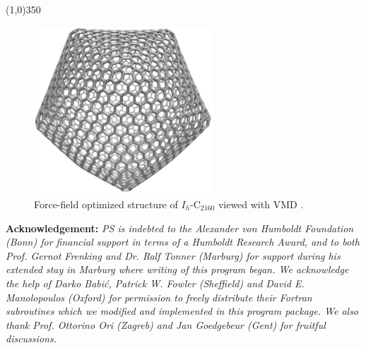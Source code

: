 \documentclass[article,a4paper,twoside]{memoir}
\newcommand{\C}[1]{\ensuremath{\mathrm{C}_{#1}}}
\begin{document}
\clearpage

\tableofcontents
\begin{center}
\line(1,0){350}
\end{center}

\vspace{1cm}
 \begin{figure}[htbp]
	\centering
  		 \includegraphics[width=0.6\textwidth]{C2160.png}
     \caption{Force-field optimized structure of $I_h$-\C{2160} viewed with VMD \cite{vmd}.}
     \label{pic:Finalgraph}
 \end{figure}

\vspace{2cm}
\textbf{Acknowledgement:} \textit{PS is indebted to the Alexander von Humboldt Foundation (Bonn) for financial support 
in terms of a Humboldt Research Award, and to both Prof. Gernot Frenking and 
Dr. Ralf Tonner (Marburg) for support during his extended stay in Marburg where 
writing of this program began. We acknowledge the help of Darko Babi\'c, Patrick 
W. Fowler (Sheffield) and David E. Manolopoulos (Oxford) for permission to freely distribute 
their Fortran subroutines which we modified and implemented in this program package.
We also thank Prof. Ottorino Ori (Zagreb) and Jan Goedgebeur (Gent) for fruitful discussions.}

\clearpage

\end{document}
